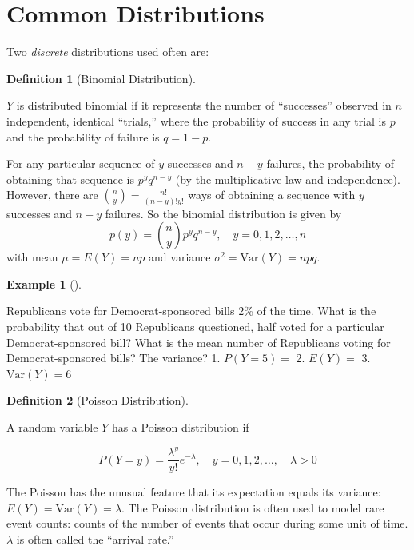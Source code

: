 \documentclass[
  letterpaper,
]{book}
\theoremstyle{definition}
\newtheorem{definition}{Definition}[chapter]
\theoremstyle{definition}
\newtheorem{example}{Example}[chapter]
\theoremstyle{plain}
\theoremstyle{definition}
\theoremstyle{plain}
\theoremstyle{plain}
\theoremstyle{remark}
\begin{document}
\hypertarget{common-distributions}{%
\section{Common Distributions}\label{common-distributions}}

Two \emph{discrete} distributions used often are:

\leavevmode{}%
\begin{definition}[Binomial Distribution]\label{def-}

\(Y\) is distributed binomial if it represents the number of
``successes'' observed in \(n\) independent, identical ``trials,'' where
the probability of success in any trial is \(p\) and the probability of
failure is \(q=1-p\).

\end{definition}

For any particular sequence of \(y\) successes and \(n-y\) failures, the
probability of obtaining that sequence is \(p^y q^{n-y}\) (by the
multiplicative law and independence). However, there are
\(\binom{n}{y}=\frac{n!}{(n-y)!y!}\) ways of obtaining a sequence with
\(y\) successes and \(n-y\) failures. So the binomial distribution is
given by \[p(y)=\binom{n}{y}p^y q^{n-y}, \quad y=0,1,2,\ldots,n\] with
mean \(\mu=E(Y)=np\) and variance \(\sigma^2=\text{Var}(Y)=npq\).

\leavevmode{}%
\begin{example}[]\label{exm-}

Republicans vote for Democrat-sponsored bills 2\% of the time. What is
the probability that out of 10 Republicans questioned, half voted for a
particular Democrat-sponsored bill? What is the mean number of
Republicans voting for Democrat-sponsored bills? The variance? 1.
\(P(Y=5)=\) 2. \(E(Y)=\) 3. \(\text{Var}(Y)=6\)

\end{example}

\leavevmode{}%
\begin{definition}[Poisson Distribution]\label{def-}

A random variable \(Y\) has a Poisson distribution if

\[P(Y = y)=\frac{\lambda^y}{y!}e^{-\lambda}, \quad y=0,1,2,\ldots, \quad \lambda>0\]

The Poisson has the unusual feature that its expectation equals its
variance: \(E(Y)=\text{Var}(Y)=\lambda\). The Poisson distribution is
often used to model rare event counts: counts of the number of events
that occur during some unit of time. \(\lambda\) is often called the
``arrival rate.''

\end{definition}
\end{document}

